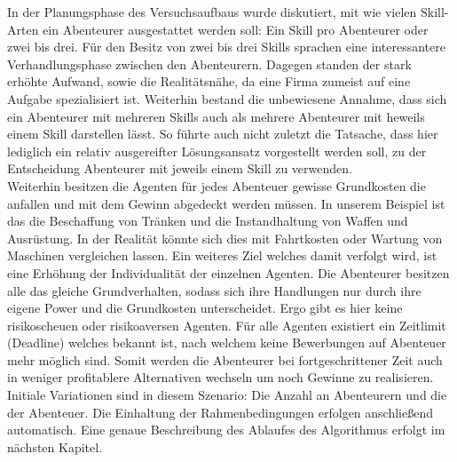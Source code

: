 \documentclass[fleqn,10pt]{SelfArx} %
\begin{document}
In der Planungsphase des Versuchsaufbaus wurde diskutiert, mit wie vielen Skill-Arten ein Abenteurer ausgestattet werden soll: Ein Skill pro Abenteurer oder zwei bis drei. Für den Besitz von zwei bis drei Skills sprachen eine interessantere Verhandlungsphase zwischen den Abenteurern. Dagegen standen der stark erhöhte Aufwand, sowie die Realitätsnähe, da eine Firma zumeist auf eine Aufgabe spezialisiert ist. Weiterhin bestand die unbewiesene Annahme, dass sich ein Abenteurer mit mehreren Skills auch als mehrere Abenteurer mit heweils einem Skill darstellen lässt. So führte auch nicht zuletzt die Tatsache, dass hier lediglich ein relativ ausgereifter Lösungsansatz vorgestellt werden soll, zu der Entscheidung Abenteurer mit jeweils einem Skill zu verwenden. \\
Weiterhin besitzen die Agenten für jedes Abenteuer gewisse Grundkosten die anfallen und mit dem Gewinn abgedeckt werden müssen. In unserem Beispiel ist das die Beschaffung von Tränken und die Instandhaltung von Waffen und Ausrüstung. In der Realität könnte sich dies mit Fahrtkosten oder Wartung von Maschinen vergleichen lassen. Ein weiteres Ziel welches damit verfolgt wird, ist eine Erhöhung der Individualität der einzelnen Agenten. Die Abenteurer besitzen alle das gleiche Grundverhalten, sodass sich ihre Handlungen nur durch ihre eigene Power und die Grundkosten unterscheidet. Ergo gibt es hier keine risikoscheuen oder risikoaversen Agenten. Für alle Agenten existiert ein Zeitlimit (Deadline) welches bekannt ist, nach welchem keine Bewerbungen auf Abenteuer mehr möglich sind. Somit werden die Abenteurer bei fortgeschrittener Zeit auch in weniger profitablere Alternativen wechseln um noch Gewinne zu realisieren.\\
Initiale Variationen sind in diesem Szenario: Die Anzahl an Abenteurern und die der Abenteuer. Die Einhaltung der Rahmenbedingungen erfolgen anschließend automatisch. Eine genaue Beschreibung des Ablaufes des Algorithmus erfolgt im nächsten Kapitel.\\


\end{document}
